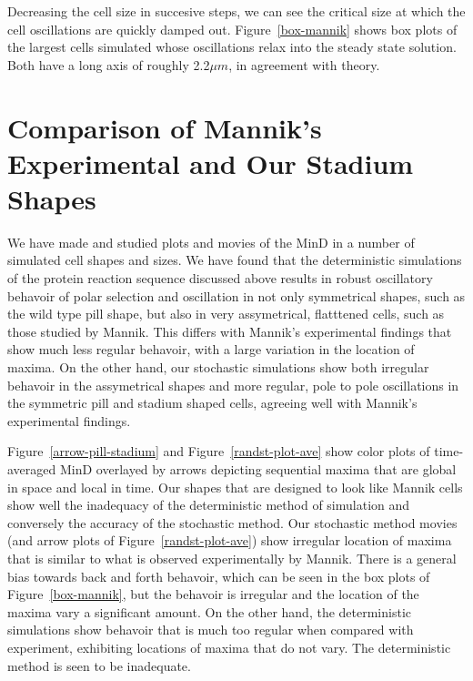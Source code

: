 \documentclass[letterpaper,twocolumn,amsmath,amssymb,pre]{revtex4-1}
\begin{document}
Decreasing the cell size in succesive steps, we can see the critical
size at which the cell oscillations are quickly damped out.
Figure~\ref{box-mannik} shows box plots of the largest cells simulated
whose oscillations relax into the steady state solution.  Both have a
long axis of roughly 2.2$\mu m$, in agreement with theory.

\section{Comparison of Mannik's Experimental and Our Stadium Shapes}
We have made and studied plots and movies of the MinD in a number of
simulated cell shapes and sizes. We have found that the deterministic
simulations of the protein reaction sequence discussed above results
in robust oscillatory behavoir of polar selection and oscillation in
not only symmetrical shapes, such as the wild type pill shape, but
also in very assymetrical, flatttened cells, such as those studied by
Mannik.  This differs with Mannik's experimental findings that show
much less regular behavoir, with a large variation in the location of
maxima.  On the other hand, our stochastic simulations show both
irregular behavoir in the assymetrical shapes and more regular, pole
to pole oscillations in the symmetric pill and stadium shaped cells,
agreeing well with Mannik's experimental findings.

Figure~\ref{arrow-pill-stadium} and Figure~\ref{randst-plot-ave} show color
plots of time-averaged MinD overlayed by arrows depicting sequential
maxima that are global in space and local in time.  Our shapes that
are designed to look like Mannik cells show well the inadequacy of the
deterministic method of simulation and conversely the accuracy of the
stochastic method.  Our stochastic method movies (and arrow plots of
Figure~\ref{randst-plot-ave}) show irregular location of maxima that is
similar to what is observed experimentally by Mannik. There is a
general bias towards back and forth behavoir, which can be seen in the
box plots of Figure~\ref{box-mannik}, but the behavoir is irregular and
the location of the maxima vary a significant amount.  On the other
hand, the deterministic simulations show behavoir that is much too
regular when compared with experiment, exhibiting locations of maxima
that do not vary.  The deterministic method is seen to be inadequate.
\end{document}
